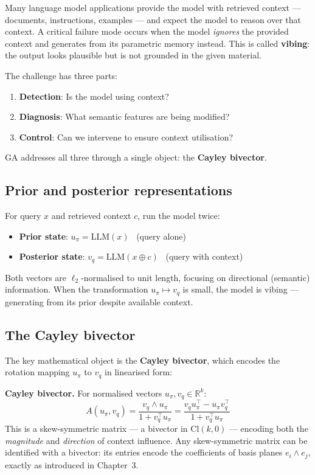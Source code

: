 \documentclass[11pt, twoside, openright]{memoir}
\newcommand{\op}{\wedge}          %
\numberwithin{equation}{chapter}
\begin{document}
Many language model applications provide the model with retrieved
context --- documents, instructions, examples --- and expect the
model to reason over that context.  A critical failure mode occurs
when the model \emph{ignores} the provided context and generates
from its parametric memory instead.  This is called \textbf{vibing}:
the output looks plausible but is not grounded in the given material.

The challenge has three parts:
\begin{enumerate}[nosep]
\item \textbf{Detection}: Is the model using context?
\item \textbf{Diagnosis}: What semantic features are being modified?
\item \textbf{Control}: Can we intervene to ensure context utilisation?
\end{enumerate}
GA addresses all three through a single object: the
\textbf{Cayley bivector}.

\subsection{Prior and posterior representations}

For query $x$ and retrieved context $c$, run the model twice:
\begin{itemize}[nosep]
\item \textbf{Prior state}: $u_\pi = \text{LLM}(x)$ \ (query alone)
\item \textbf{Posterior state}: $v_q = \text{LLM}(x \oplus c)$
  \ (query with context)
\end{itemize}
Both vectors are $\ell_2$-normalised to unit length, focusing on
directional (semantic) information.  When the transformation
$u_\pi \mapsto v_q$ is small, the model is vibing --- generating from
its prior despite available context.

\subsection{The Cayley bivector}

The key mathematical object is the \textbf{Cayley bivector}, which
encodes the rotation mapping $u_\pi$ to $v_q$ in linearised form:

\begin{gabox}
\textbf{Cayley bivector.}
For normalised vectors $u_\pi, v_q \in \mathbb{R}^k$:
\begin{equation}
  A(u_\pi, v_q) = \frac{v_q \op u_\pi}{1 + v_q^\top u_\pi}
  = \frac{v_q u_\pi^\top - u_\pi v_q^\top}{1 + v_q^\top u_\pi}
\end{equation}
This is a skew-symmetric matrix --- a bivector in $\mathrm{Cl}(k, 0)$
--- encoding both the \emph{magnitude} and \emph{direction} of context
influence.
Any skew-symmetric matrix can be identified with a bivector: its entries encode the coefficients of basis planes $e_i \wedge e_j$, exactly as introduced in Chapter~3.
\end{gabox}
\end{document}
